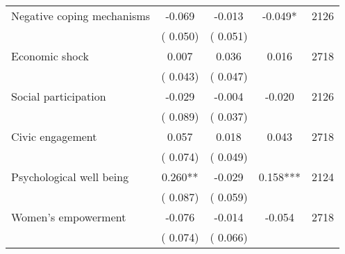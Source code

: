 \begin{tabular}{l*{4}{c}}
 Negative coping mechanisms                       &             -0.069 &        -0.013            &             -0.049*     & 2126                             \\  
                                       &          (       0.050)               &        (       0.051)                                &                                               &                                               \\      

 Economic shock                       &              0.007 &         0.036            &              0.016     & 2718                             \\  
                                       &          (       0.043)               &        (       0.047)                                &                                               &                                               \\      

 Social participation                       &             -0.029 &        -0.004            &             -0.020     & 2126                             \\  
                                       &          (       0.089)               &        (       0.037)                                &                                               &                                               \\      

 Civic engagement                       &              0.057 &         0.018            &              0.043     & 2718                             \\  
                                       &          (       0.074)               &        (       0.049)                                &                                               &                                               \\      

 Psychological well being                       &              0.260** &        -0.029            &              0.158***     & 2124                             \\  
                                       &          (       0.087)               &        (       0.059)                                &                                               &                                               \\      

 Women's empowerment                       &             -0.076 &        -0.014            &             -0.054     & 2718                             \\  
                                       &          (       0.074)               &        (       0.066)                                &                                               &                                               \\      

\hline \end{tabular}                                                                                                              
